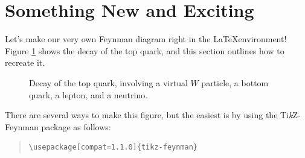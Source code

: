 \documentclass[12pt, letterpaper]{article}
\begin{document}
\section{Something New and Exciting}


Let's make our very own Feynman diagram right in the \LaTeX environment! Figure \ref{fig:feynman} shows the decay of the top quark, and this section outlines how to recreate it.

\begin{figure}[ht!]
  \centering
  \caption{Decay of the top quark, involving a virtual $W$ particle, a bottom quark, a lepton, and a neutrino.}
  \label{fig:feynman}
\end{figure}

There are several ways to make this figure, but the easiest is by using the Ti\textit{k}Z-Feynman package as follows:

\begin{quote}
\begin{verbatim}
\usepackage[compat=1.1.0]{tikz-feynman}
\end{verbatim}
\end{quote}
\end{document}
